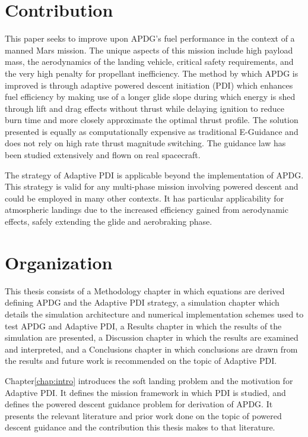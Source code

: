 \section{Contribution}
This paper seeks to improve upon APDG's fuel performance in the context of a manned Mars mission. The unique aspects of this mission include high payload mass, the aerodynamics of the landing vehicle, critical safety requirements, and the very high penalty for propellant inefficiency. The method by which APDG is improved is through adaptive powered descent initiation (PDI) which enhances fuel efficiency by making use of a longer glide slope during which energy is shed through lift and drag effects without thrust while delaying ignition to reduce burn time and more closely approximate the optimal thrust profile. The solution presented is equally as computationally expensive as traditional E-Guidance and does not rely on high rate thrust magnitude switching. The guidance law has been studied extensively and flown on real spacecraft.

The strategy of Adaptive PDI is applicable beyond the implementation of APDG. This strategy is valid for any multi-phase mission involving powered descent and could be employed in many other contexts. It has particular applicability for atmospheric landings due to the increased efficiency gained from aerodynamic effects, safely extending the glide and aerobraking phase.

\section{Organization}
This thesis consists of a Methodology chapter in which equations are derived defining APDG and the Adaptive PDI strategy, a simulation chapter which details the simulation architecture and numerical implementation schemes used to test APDG and Adaptive PDI, a Results chapter in which the results of the simulation are presented, a Discussion chapter in which the results are examined and interpreted, and a Conclusions chapter in which conclusions are drawn from the results and future work is recommended on the topic of Adaptive PDI.

Chapter\:\ref{chap:intro} introduces the soft landing problem and the motivation for Adaptive PDI. It defines the mission framework in which PDI is studied, and defines the powered descent guidance problem for derivation of APDG. It presents the relevant literature and prior work done on the topic of powered descent guidance and the contribution this thesis makes to that literature.

